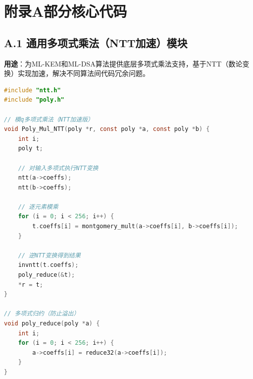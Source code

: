 \section*{附录A\quad 部分核心代码}

\subsection*{A.1 通用多项式乘法（NTT加速）模块}
\textbf{用途}：为ML-KEM和ML-DSA算法提供底层多项式乘法支持，基于NTT（数论变换）实现加速，解决不同算法间代码冗余问题。
\begin{lstlisting}[language=C, caption=通用Poly\_Mul\_NTT模块实现]
#include "ntt.h"
#include "poly.h"

// 模q多项式乘法（NTT加速版）
void Poly_Mul_NTT(poly *r, const poly *a, const poly *b) {
    int i;
    poly t;

    // 对输入多项式执行NTT变换
    ntt(a->coeffs);
    ntt(b->coeffs);

    // 逐元素模乘
    for (i = 0; i < 256; i++) {
        t.coeffs[i] = montgomery_mult(a->coeffs[i], b->coeffs[i]);
    }

    // 逆NTT变换得到结果
    invntt(t.coeffs);
    poly_reduce(&t);
    *r = t;
}

// 多项式归约（防止溢出）
void poly_reduce(poly *a) {
    int i;
    for (i = 0; i < 256; i++) {
        a->coeffs[i] = reduce32(a->coeffs[i]);
    }
}
\end{lstlisting}

